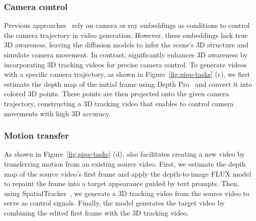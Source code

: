 
\subsubsection{Camera control}
Previous approaches~\cite{he2024cameractrl,wang2024motionctrl} rely on camera or ray embeddings as conditions to control the camera trajectory in video generation. However, these embeddings lack true 3D awareness, leaving the diffusion models to infer the scene's 3D structure and simulate camera movement. In contrast, \methodname significantly enhances 3D awareness by incorporating 3D tracking videos for precise camera control. To generate videos with a specific camera trajectory, as shown in Figure~\ref{fig:pipe-tasks} (c), we first estimate the depth map of the initial frame using Depth Pro~\cite{bochkovskii2024depth} and convert it into colored 3D points. These points are then projected onto the given camera trajectory, constructing a 3D tracking video that enables \methodname to control camera movements with high 3D accuracy.


\subsubsection{Motion transfer}
As shown in Figure~\ref{fig:pipe-tasks} (d), \methodname also facilitates creating a new video by transferring motion from an existing source video. First, we estimate the depth map of the source video’s first frame and apply the depth-to-image FLUX model~\cite{flux} to repaint the frame into a target appearance guided by text prompts. Then, using SpatialTracker~\cite{xiao2024spatialtracker}, we generate a 3D tracking video from the source video to serve as control signals. Finally, the \methodname model generates the target video by combining the edited first frame with the 3D tracking video.

